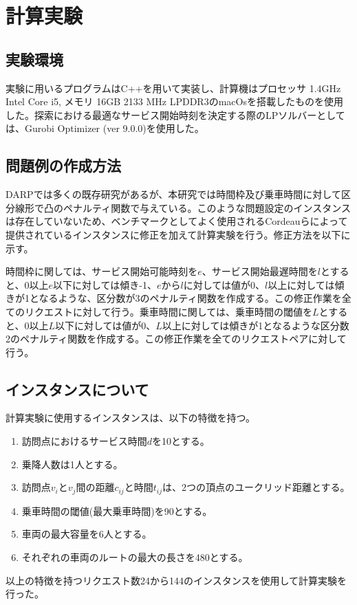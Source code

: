 \chapter{計算実験}\label{computational_result}
\section{実験環境}
実験に用いるプログラムはC++を用いて実装し、計算機はプロセッサ 1.4GHz Intel Core i5, メモリ 16GB 2133 MHz LPDDR3のmacOsを搭載したものを使用した。探索における最適なサービス開始時刻を決定する際のLPソルバーとしては、Gurobi Optimizer (ver 9.0.0)を使用した。

\section{問題例の作成方法}
DARPでは多くの既存研究があるが、本研究では時間枠及び乗車時間に対して区分線形で凸のペナルティ関数で与えている。このような問題設定のインスタンスは存在していないため、ベンチマークとしてよく使用されるCordeauらによって提供されている\cite{tabu}インスタンスに修正を加えて計算実験を行う。修正方法を以下に示す。

時間枠に関しては、サービス開始可能時刻を$e$、サービス開始最遅時間を$l$とすると、0以上$e$以下に対しては傾き-1、$e$から$l$に対しては値が0、$l$以上に対しては傾きが1となるような、区分数が3のペナルティ関数を作成する。この修正作業を全てのリクエストに対して行う。乗車時間に関しては、乗車時間の閾値を$L$とすると、0以上$L$以下に対しては値が0、$L$以上に対しては傾きが1となるような区分数2のペナルティ関数を作成する。この修正作業を全てのリクエストペアに対して行う。
\section{インスタンスについて}
計算実験に使用するインスタンスは、以下の特徴を持つ。
\begin{enumerate}
 \item 訪問点におけるサービス時間$d$を10とする。
 \item 乗降人数は1人とする。
 \item 訪問点$v_i$と$v_j$間の距離$c_{ij}$と時間$t_{ij}$は、2つの頂点のユークリッド距離とする。
 \item 乗車時間の閾値(最大乗車時間)を90とする。
 \item 車両の最大容量を6人とする。
 \item それぞれの車両のルートの最大の長さを480とする。
\end{enumerate}
以上の特徴を持つリクエスト数24から144のインスタンスを使用して計算実験を行った。
